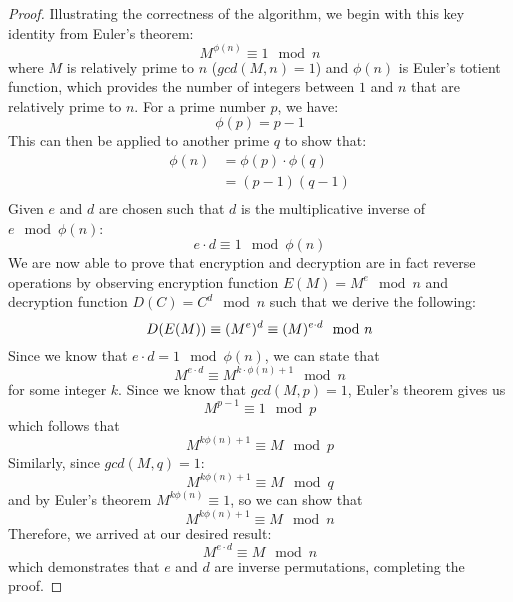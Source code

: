 \documentclass{article}
\begin{document}
\begin{proof}
Illustrating the correctness of the algorithm, we begin with this key identity from Euler's theorem:
\begin{equation}
M^{\phi(n)} \equiv 1 \mod n
\end{equation}
where $M$ is relatively prime to $n$ ($gcd(M, n) = 1$) and $\phi(n)$ is Euler's totient function, which provides the number of integers between $1$ and $n$ that are relatively prime to $n$. For a prime number $p$, we have:
\begin{equation}
    \phi(p) = p-1
\end{equation}
This can then be applied to another prime $q$ to show that:
\begin{equation}
\begin{aligned}
    \phi(n) &= \phi(p)\cdot \phi(q)\\
    &= (p-1)(q-1)\\
\end{aligned}
\end{equation}
Given $e$ and $d$ are chosen such that $d$ is the multiplicative inverse of $e \mod \phi(n)$:
\begin{equation}
e \cdot d \equiv 1 \mod \phi(n)
\end{equation}
We are now able to prove that encryption and decryption are in fact reverse operations by observing encryption function $E(M) = M^e \mod n$ and decryption function $D(C) = C^d \mod n$ such that we derive the following:
\begin{equation}
   D(E(M))\equiv (M^e)^d \equiv (M)^{e\cdot d} \mod n\\
\end{equation}
Since we know that $e \cdot d = 1 \mod \phi(n)$, we can state that
\begin{equation}
M^{e \cdot d} \equiv M^{k \cdot \phi(n)+1} \mod n
\end{equation}
for some integer $k$. Since we know that $gcd(M, p) = 1$, Euler's theorem gives us
\begin{equation}
M^{p-1} \equiv 1 \mod p
\end{equation}
which follows that
\begin{equation}
M^{k\phi(n)+ 1} \equiv M \mod p
\end{equation}
Similarly, since $gcd(M, q) = 1$:
\begin{equation}
M^{k\phi(n)+ 1} \equiv M \mod q
\end{equation}
and by Euler's theorem $M^{k \phi(n)} \equiv 1$, so we can show that
\begin{equation}
M^{k\phi(n)+ 1} \equiv M \mod n
\end{equation}
Therefore, we arrived at our desired result:
\begin{equation}
M^{e\cdot d} \equiv M \mod n
\end{equation}
which demonstrates that $e$ and $d$ are inverse permutations, completing the proof. 
\end{proof}
\end{document}

